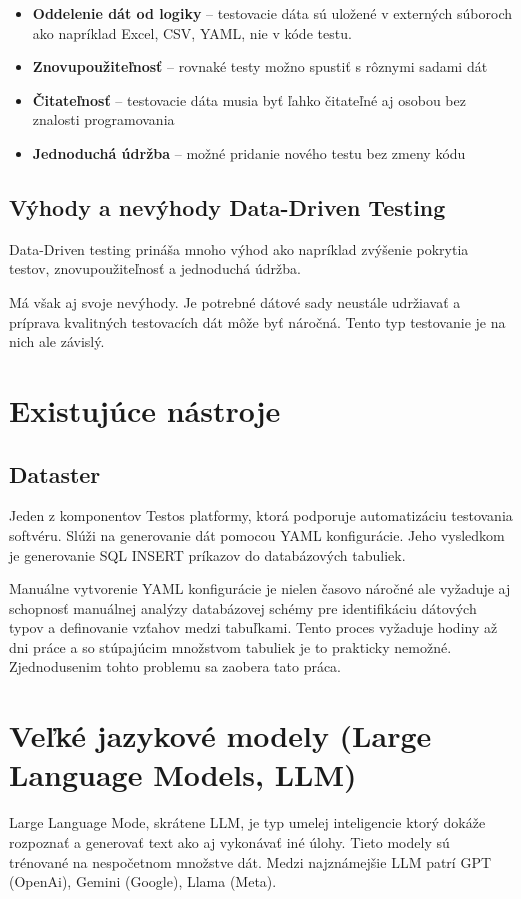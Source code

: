 \begin{itemize}
\item \textbf{Oddelenie dát od logiky} -- testovacie dáta sú uložené v externých súboroch ako napríklad Excel, CSV, YAML, nie v kóde testu.
\item \textbf{Znovupoužiteľnosť} -- rovnaké testy možno spustiť s rôznymi sadami dát
\item \textbf{Čitateľnosť} --  testovacie dáta musia byť ľahko čitateľné aj osobou bez znalosti programovania \cite{Laukkanen2006}

\item \textbf{Jednoduchá údržba} -- možné pridanie nového testu bez zmeny kódu
\end{itemize}

\subsection{Výhody a nevýhody Data-Driven Testing}

Data-Driven testing prináša mnoho výhod ako napríklad zvýšenie pokrytia testov, znovupoužiteľnosť a jednoduchá údržba.

Má však aj svoje nevýhody. Je potrebné dátové sady neustále udržiavať a príprava kvalitných testovacích dát môže byť náročná. Tento typ testovanie je na nich ale závislý.


\section{Existujúce nástroje}

\subsection{Dataster}
Jeden z komponentov Testos platformy, ktorá podporuje automatizáciu testovania softvéru. Slúži na generovanie dát pomocou YAML konfigurácie. Jeho vysledkom je generovanie SQL INSERT príkazov do databázových tabuliek.

Manuálne vytvorenie YAML konfigurácie je nielen časovo náročné ale vyžaduje aj schopnosť manuálnej analýzy databázovej schémy pre identifikáciu dátových typov a definovanie vzťahov medzi tabuľkami. Tento proces vyžaduje hodiny až dni práce a so stúpajúcim množstvom tabuliek je to prakticky nemožné.  Zjednodusenim tohto problemu sa zaobera tato práca.

\section{Veľké jazykové modely (Large Language Models, LLM)}
Large Language Mode, skrátene LLM, je typ umelej inteligencie ktorý dokáže rozpoznať a generovať text ako aj vykonávať iné úlohy. Tieto modely sú trénované na nespočetnom množstve dát. Medzi najznámejšie LLM patrí GPT (OpenAi), Gemini (Google), Llama (Meta).

